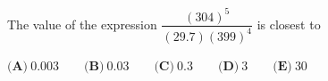 The value of the expression $\dfrac{(304)^5}{(29.7)(399)^4}$ is closest to

$\textbf{(A)}\ 0.003 \qquad \textbf{(B)}\ 0.03 \qquad \textbf{(C)}\ 0.3 \qquad \textbf{(D)}\ 3 \qquad \textbf{(E)}\ 30$
